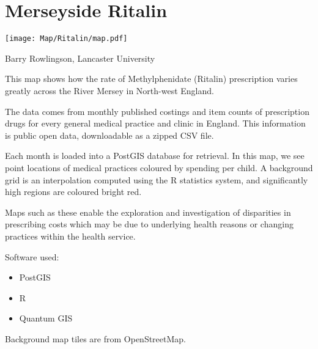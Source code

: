 

\chapter{Merseyside Ritalin}

\begin{marginfigure}
\texttt{[image: Map/Ritalin/map.pdf]}
\end{marginfigure}

Barry Rowlingson, Lancaster University

This map shows how the rate of Methylphenidate (Ritalin) prescription varies
greatly across the River Mersey in North-west England.

The data comes from monthly published costings and item counts of
prescription drugs for every general medical practice and clinic in 
England. This information is public open data, downloadable as a 
zipped CSV file.

Each month is loaded into a PostGIS database for retrieval. In this map,
we see point locations of medical practices coloured by spending per child.
A background grid is an interpolation computed using the R statistics system,
and significantly high regions are coloured bright red.

Maps such as these enable the exploration and investigation of disparities in
prescribing costs which may be due to underlying health reasons or changing
practices within the health service.

Software used:

\begin{itemize}
\item PostGIS 
\item R 
\item Quantum GIS 
\end{itemize}

Background map tiles are from OpenStreetMap. 

